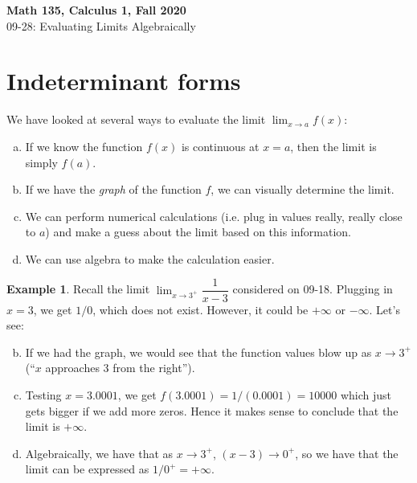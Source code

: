 \documentclass[11pt,reqno,final]{amsart}
\numberwithin{figure}{section}
\theoremstyle{definition} %
\newtheorem{example}[equation]{Example}%
\newcommand{\dlim}{\displaystyle\lim}
\begin{document}
\onehalfspacing

\begin{center}
        \textbf{\Large Math 135, Calculus 1, Fall 2020}\\[10pt]
        {\large 09-28: Evaluating Limits Algebraically}
\end{center}

\thispagestyle{empty}

\renewcommand{\thesection}{\Alph{section}}

\vspace{-1pt}
\section{Indeterminant forms}

We have looked at several ways to evaluate the limit $\dlim_{x \to a}f(x)$:
\begin{enumerate}[(a)]
\item If we know the function $f(x)$ is continuous at $x = a$, then the limit is simply $f(a)$.
\item If we have the \textit{graph} of the function $f$, we can visually determine the limit.
\item We can perform numerical calculations (i.e. plug in values really, really close to $a$) and make a guess about the limit based on this information.
\item We can use algebra to make the calculation easier.
\end{enumerate}

\begin{example}
        Recall the limit $\dlim_{x \to 3^+}\dfrac{1}{x-3}$ considered on 09-18.
        Plugging in $x=3$, we get $1/0$, which does not exist.
        However, it could be $+\infty$ or $-\infty$. Let's see:
        \begin{enumerate}[(a)]\setcounter{enumi}{1}
        \item If we had the graph, we would see that the function values blow up as $x \to 3^+$ (``$x$ approaches 3 from the right'').
        \item Testing $x = 3.0001$, we get $f(3.0001) = 1/(0.0001) = 10000$ which just gets bigger if we add more zeros. Hence it makes sense to conclude that the limit is $+\infty$.
        \item Algebraically, we have that as $x \to 3^+$, $(x-3) \to 0^+$, so we have that the limit can be expressed as
                $1/0^+ = +\infty$.
        \end{enumerate}
\end{example}
\end{document}
